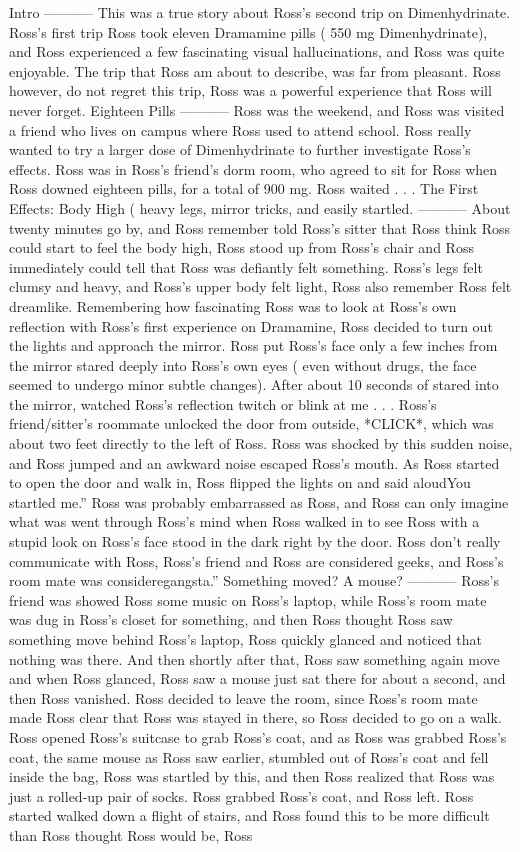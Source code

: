 \documentclass[12pt]{book}
\begin{document}
Intro ----------- This was a true story about Ross's second trip on Dimenhydrinate. Ross's first trip Ross took eleven Dramamine pills ( 550 mg Dimenhydrinate), and Ross experienced a few fascinating visual hallucinations, and Ross was quite enjoyable. The trip that Ross am about to describe, was far from pleasant. Ross however, do not regret this trip, Ross was a powerful experience that Ross will never forget. Eighteen Pills ----------- Ross was the weekend, and Ross was visited a friend who lives on campus where Ross used to attend school. Ross really wanted to try a larger dose of Dimenhydrinate to further investigate Ross's effects. Ross was in Ross's friend's dorm room, who agreed to sit for Ross when Ross downed eighteen pills, for a total of 900 mg. Ross waited . . .  The First Effects: Body High ( heavy legs, mirror tricks, and easily startled. ----------- About twenty minutes go by, and Ross remember told Ross's sitter that Ross think Ross could start to feel the body high, Ross stood up from Ross's chair and Ross immediately could tell that Ross was defiantly felt something. Ross's legs felt clumsy and heavy, and Ross's upper body felt light, Ross also remember Ross felt dreamlike. Remembering how fascinating Ross was to look at Ross's own reflection with Ross's first experience on Dramamine, Ross decided to turn out the lights and approach the mirror. Ross put Ross's face only a few inches from the mirror stared deeply into Ross's own eyes ( even without drugs, the face seemed to undergo minor subtle changes). After about 10 seconds of stared into the mirror, watched Ross's reflection twitch or blink at me . . .  Ross's friend/sitter's roommate unlocked the door from outside, *CLICK*, which was about two feet directly to the left of Ross. Ross was shocked by this sudden noise, and Ross jumped and an awkward noise escaped Ross's mouth. As Ross started to open the door and walk in, Ross flipped the lights on and said aloudYou startled me.'' Ross was probably embarrassed as Ross, and Ross can only imagine what was went through Ross's mind when Ross walked in to see Ross with a stupid look on Ross's face stood in the dark right by the door. Ross don't really communicate with Ross, Ross's friend and Ross are considered geeks, and Ross's room mate was consideregangsta.'' Something moved? A mouse? ----------- Ross's friend was showed Ross some music on Ross's laptop, while Ross's room mate was dug in Ross's closet for something, and then Ross thought Ross saw something move behind Ross's laptop, Ross quickly glanced and noticed that nothing was there. And then shortly after that, Ross saw something again move and when Ross glanced, Ross saw a mouse just sat there for about a second, and then Ross vanished. Ross decided to leave the room, since Ross's room mate made Ross clear that Ross was stayed in there, so Ross decided to go on a walk. Ross opened Ross's suitcase to grab Ross's coat, and as Ross was grabbed Ross's coat, the same mouse as Ross saw earlier, stumbled out of Ross's coat and fell inside the bag, Ross was startled by this, and then Ross realized that Ross was just a rolled-up pair of socks. Ross grabbed Ross's coat, and Ross left. Ross started walked down a flight of stairs, and Ross found this to be more difficult than Ross thought Ross would be, Ross 
\end{document}
